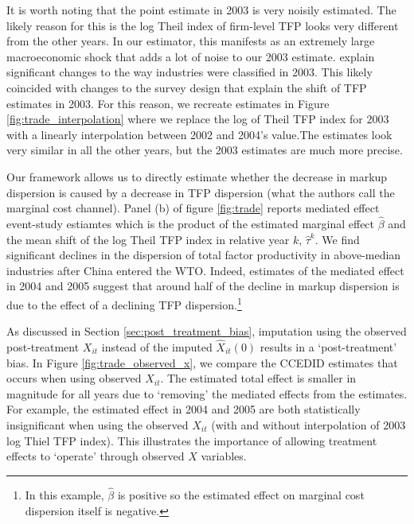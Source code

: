 \documentclass[12pt,fleqn]{article}
\begin{document}
It is worth noting that the point estimate in 2003 is very noisily estimated. The likely reason for this is the log Theil index of firm-level TFP looks very different from the other years. In our estimator, this manifests as an extremely large macroeconomic shock that adds a lot of noise to our 2003 estimate. \citet{lu2015trade} explain significant changes to the way industries were classified in 2003. This likely coincided with changes to the survey design that explain the shift of TFP estimates in 2003. For this reason, we recreate estimates in Figure \ref{fig:trade_interpolation} where we replace the log of Theil TFP index for 2003 with a linearly interpolation between 2002 and 2004's value.The estimates look very similar in all the other years, but the 2003 estimates are much more precise.

Our framework allows us to directly estimate whether the decrease in markup dispersion is caused by a decrease in TFP dispersion (what the authors call the marginal cost channel). Panel (b) of figure \ref{fig:trade} reports mediated effect event-study estiamtes which is the product of the estimated marginal effect $\hat{\beta}$ and the mean shift of the log Theil TFP index in relative year $k$, $\hat{\tau}^k$. We find significant declines in the dispersion of total factor productivity in above-median industries after China entered the WTO. Indeed, estimates of the mediated effect in 2004 and 2005 suggest that around half of the decline in markup dispersion is due to the effect of a declining TFP dispersion.\footnote{In this example, $\hat{\beta}$ is positive so the estimated effect on marginal cost dispersion itself is negative.} 

As discussed in Section \ref{sec:post_treatment_bias}, imputation using the observed post-treatment $X_{it}$ instead of the imputed $\hat{X}_{it}(0)$ results in a `post-treatment' bias. In Figure \ref{fig:trade_observed_x}, we compare the CCEDID estimates that occurs when using observed $X_{it}$. The estimated total effect is smaller in magnitude for all years due to `removing' the mediated effects from the estimates. For example, the estimated effect in 2004 and 2005 are both statistically insignificant when using the observed $X_{it}$ (with and without interpolation of 2003 log Thiel TFP index). This illustrates the importance of allowing treatment effects to `operate' through observed $X$ variables. 
\end{document}
